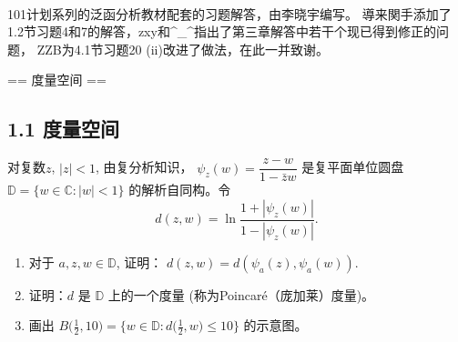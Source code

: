 \begin{ack*}\\
    101计划系列的泛函分析教材配套的习题解答，由李晓宇编写。
    導来関手添加了1.2节习题4和7的解答，zxy和^_^指出了第三章解答中若干个现已得到修正的问题，
    ZZB为4.1节习题20 (ii)改进了做法，在此一并致谢。
\end{ack*}

== 度量空间 ==

\subsection{1.1 度量空间}
\begin{9}
    对复数$z$, $|z|<1$, 由复分析知识，
    $\psi_{z}(w)=\dfrac{z-w}{1-\bar{z}w}$
    是复平面单位圆盘
    $\mathbb{D}=\{w\in\mathbb{C}:|w|<1\}$
    的解析自同构。令
    $$d(z,w)=\ln\frac{1+|\psi_{z}(w)|}{1-|\psi_{z}(w)|}.$$
    \begin{enumerate}[label=(\roman*)]
        \item 对于 $a,z,w\in\mathbb{D}$, 证明：
        $d(z,w)=d(\psi_{a}(z),\psi_{a}(w))$.
        \item 证明：$d$ 是 $\mathbb{D}$ 上的一个度量 (称为Poincaré（庞加莱）度量)。
        \item 画出
        $B\big(\frac{1}{2},10\big)=\{w\in\mathbb{D}:d\big(\frac{1}{2},w\big)\leqslant10\}$
        的示意图。
    \end{enumerate}
\end{9}

